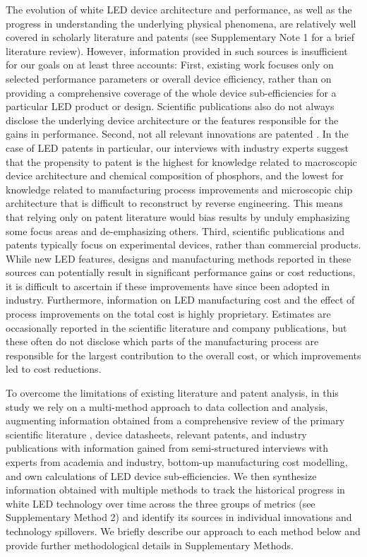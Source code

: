 \documentclass[parskip=full]{article}
\begin{document}
The evolution of white LED device architecture and performance, as well as the progress in understanding the underlying physical phenomena, are relatively well covered in scholarly literature and patents (see Supplementary Note 1 for a brief literature review). However, information provided in such sources is insufficient for our goals on at least three accounts: First, existing work focuses only on selected performance parameters or overall device efficiency, rather than on providing a comprehensive coverage of the whole device sub-efficiencies for a particular LED product or design. Scientific publications also do not always disclose the underlying device architecture or the features responsible for the gains in performance. Second, not all relevant innovations are patented \cite{Pakes_1980,Fontana_2013}. In the case of LED patents in particular, our interviews with industry experts suggest that the propensity to patent is the highest for knowledge related to macroscopic device architecture and chemical composition of phosphors, and the lowest for knowledge related to manufacturing process improvements and microscopic chip architecture that is difficult to reconstruct by reverse engineering. This means that relying only on patent literature would bias results by unduly emphasizing some focus areas and de-emphasizing others. Third, scientific publications and patents typically focus on experimental devices, rather than commercial products. While new LED features, designs and manufacturing methods reported in these sources can potentially result in significant performance gains or cost reductions, it is difficult to ascertain if these improvements have since been adopted in industry. Furthermore, information on LED manufacturing cost and the effect of process improvements on the total cost is highly proprietary. Estimates are occasionally reported in the scientific literature and company publications, but these often do not disclose which parts of the manufacturing process are responsible for the largest contribution to the overall cost, or which improvements led to cost reductions.

To overcome the limitations of existing literature and patent analysis, in this study we rely on a multi-method approach to data collection and analysis, augmenting information obtained from a comprehensive review of the primary scientific literature \cite{Haddaway_2014}, device datasheets, relevant patents, and industry publications with information gained from semi-structured interviews with experts from academia and industry, bottom-up manufacturing cost modelling, and own calculations of LED device sub-efficiencies. We then synthesize information obtained with multiple methods to track the historical progress in white LED technology over time across the three groups of metrics (see Supplementary Method 2) and identify its sources in individual innovations and technology spillovers. We briefly describe our approach to each method below and provide further methodological details in Supplementary Methods. 
\end{document}
